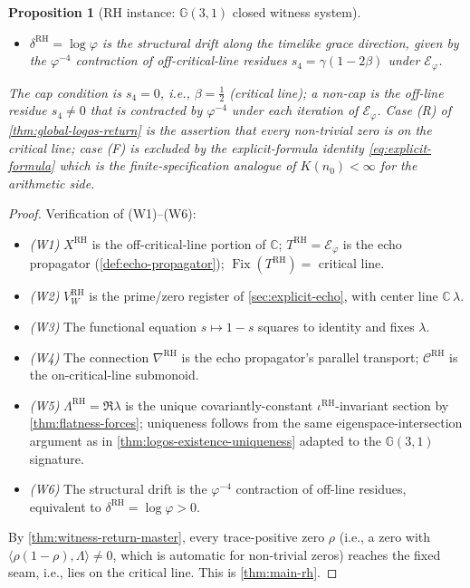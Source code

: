 \documentclass[11pt,a4paper]{article}
\theoremstyle{plain}
\newtheorem{proposition}[theorem]{Proposition}
\theoremstyle{definition}
\theoremstyle{remark}
\numberwithin{equation}{section}
\newcommand{\Cl}{\mathbb{G}}
\newcommand{\Complex}{\mathbb{C}}
\newcommand{\vp}{\varphi}
\DeclareMathOperator{\Fix}{Fix}
\begin{document}
\begin{proposition}[RH instance: $\Cl(3,1)$ closed witness system]
\begin{itemize}
        is the unique covariantly-constant
        $\iota^{\text{RH}}$-invariant section of
        $V_W^{\text{RH}}$ (\cref{thm:flatness-forces});
  \item $\delta^{\text{RH}}=\log\vp$ is the structural drift
        along the timelike grace direction, given by the
        $\vp^{-4}$ contraction of off-critical-line residues
        $s_4=\gamma(1-2\beta)$ under $\mathcal{E}_\vp$.
\end{itemize}
The cap condition is $s_4=0$, i.e., $\beta=\tfrac12$
(critical line); a non-cap is the off-line residue $s_4\ne 0$
that is contracted by $\vp^{-4}$ under each iteration of
$\mathcal{E}_\vp$.  Case (R) of
\cref{thm:global-logos-return} is the assertion that every
non-trivial zero is on the critical line; case (F) is excluded
by the explicit-formula identity \eqref{eq:explicit-formula}
which is the finite-specification analogue of $K(n_0)<\infty$
for the arithmetic side.
\end{proposition}

\begin{proof}
Verification of (W1)--(W6):
\begin{itemize}
  \item \emph{(W1)} $X^{\text{RH}}$ is the off-critical-line
        portion of $\Complex$; $T^{\text{RH}}=\mathcal{E}_\vp$
        is the echo propagator (\cref{def:echo-propagator});
        $\Fix(T^{\text{RH}})=$ critical line.
  \item \emph{(W2)} $V_W^{\text{RH}}$ is the prime/zero
        register of \cref{sec:explicit-echo}, with center line
        $\Complex\,\lambda$.
  \item \emph{(W3)} The functional equation $s\mapsto 1-s$
        squares to identity and fixes $\lambda$.
  \item \emph{(W4)} The connection $\nabla^{\text{RH}}$ is the
        echo propagator's parallel transport;
        $\mathcal{C}^{\text{RH}}$ is the on-critical-line
        submonoid.
  \item \emph{(W5)} $\Lambda^{\text{RH}}=\Re\lambda$ is the
        unique covariantly-constant
        $\iota^{\text{RH}}$-invariant section by
        \cref{thm:flatness-forces}; uniqueness follows from
        the same eigenspace-intersection argument as in
        \cref{thm:logos-existence-uniqueness} adapted to the
        $\Cl(3,1)$ signature.
  \item \emph{(W6)} The structural drift is the $\vp^{-4}$
        contraction of off-line residues, equivalent to
        $\delta^{\text{RH}}=\log\vp>0$.
\end{itemize}
By \cref{thm:witness-return-master}, every trace-positive zero
$\rho$ (i.e., a zero with $\langle\rho(1-\rho),\Lambda\rangle\ne
0$, which is automatic for non-trivial zeros) reaches the fixed
seam, i.e., lies on the critical line.  This is
\cref{thm:main-rh}.
\end{proof}
\end{document}
